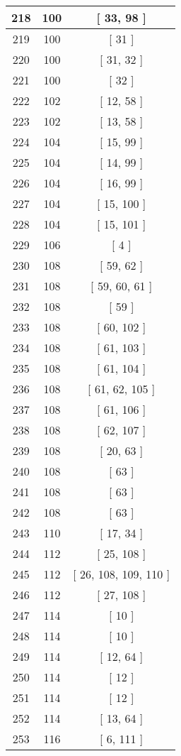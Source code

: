 \begin{center}
\begin{longtable}[H]{|| c c c ||}
\hline
218 & 100 & [ 33, 98 ] \\ 
\hline
219 & 100 & [ 31 ] \\ 
\hline
220 & 100 & [ 31, 32 ] \\ 
\hline
221 & 100 & [ 32 ] \\ 
\hline
222 & 102 & [ 12, 58 ] \\ 
\hline
223 & 102 & [ 13, 58 ] \\ 
\hline
224 & 104 & [ 15, 99 ] \\ 
\hline
225 & 104 & [ 14, 99 ] \\ 
\hline
226 & 104 & [ 16, 99 ] \\ 
\hline
227 & 104 & [ 15, 100 ] \\ 
\hline
228 & 104 & [ 15, 101 ] \\ 
\hline
229 & 106 & [ 4 ] \\ 
\hline
230 & 108 & [ 59, 62 ] \\ 
\hline
231 & 108 & [ 59, 60, 61 ] \\ 
\hline
232 & 108 & [ 59 ] \\ 
\hline
233 & 108 & [ 60, 102 ] \\ 
\hline
234 & 108 & [ 61, 103 ] \\ 
\hline
235 & 108 & [ 61, 104 ] \\ 
\hline
236 & 108 & [ 61, 62, 105 ] \\ 
\hline
237 & 108 & [ 61, 106 ] \\ 
\hline
238 & 108 & [ 62, 107 ] \\ 
\hline
239 & 108 & [ 20, 63 ] \\ 
\hline
240 & 108 & [ 63 ] \\ 
\hline
241 & 108 & [ 63 ] \\ 
\hline
242 & 108 & [ 63 ] \\ 
\hline
243 & 110 & [ 17, 34 ] \\ 
\hline
244 & 112 & [ 25, 108 ] \\ 
\hline
245 & 112 & [ 26, 108, 109, 110 ] \\ 
\hline
246 & 112 & [ 27, 108 ] \\ 
\hline
247 & 114 & [ 10 ] \\ 
\hline
248 & 114 & [ 10 ] \\ 
\hline
249 & 114 & [ 12, 64 ] \\ 
\hline
250 & 114 & [ 12 ] \\ 
\hline
251 & 114 & [ 12 ] \\ 
\hline
252 & 114 & [ 13, 64 ] \\ 
\hline
253 & 116 & [ 6, 111 ] \\ 

\end{longtable}
\end{center}
